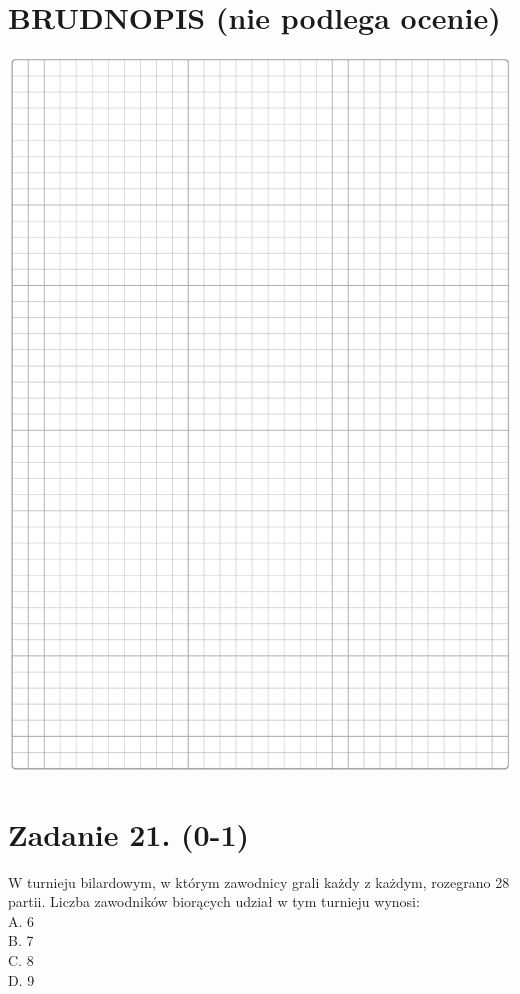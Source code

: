 \documentclass[10pt]{article}
\begin{document}
\section*{BRUDNOPIS (nie podlega ocenie)}
\begin{center}
\includegraphics[max width=\textwidth]{2024_11_21_6574e892c2387ce90f12g-07}
\end{center}

\section*{Zadanie 21. (0-1)}
W turnieju bilardowym, w którym zawodnicy grali każdy z każdym, rozegrano 28 partii. Liczba zawodników biorących udział w tym turnieju wynosi:\\
A. 6\\
B. 7\\
C. 8\\
D. 9
\end{document}
